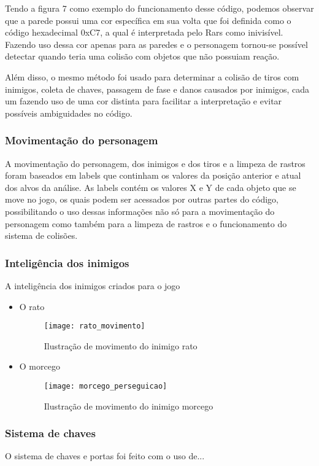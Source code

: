 \documentclass[conference]{IEEEtran}
\begin{document}
Tendo a figura 7 como exemplo do funcionamento desse código, podemos observar que a parede possui uma cor específica em sua volta que foi definida como o código hexadecimal 0xC7, a qual é interpretada pelo Rars como inivisível. Fazendo uso dessa cor apenas para as paredes e o personagem tornou-se possível detectar quando teria uma colisão com objetos que não possuiam reação.

Além disso, o mesmo método foi usado para determinar a colisão de tiros com inimigos, coleta de chaves, passagem de fase e danos causados por inimigos, cada um fazendo uso de uma cor distinta para facilitar a interpretação e evitar possíveis ambiguidades no código.
\subsubsection{Movimentação do personagem} 
  A movimentação do personagem, dos inimigos e dos tiros e a limpeza de rastros foram baseados em labels que continham  os valores da posição anterior e atual dos alvos da análise. As labels contém os valores X e Y de cada objeto que se move no jogo, os quais podem ser acessados por outras partes do código, possibilitando o uso dessas informações não só para a movimentação do personagem como também para a limpeza de rastros e o funcionamento do sistema de colisões.
  
\subsubsection{Inteligência dos inimigos} 
  A inteligência dos inimigos criados para o jogo
\begin{itemize}
  \item O rato
  
\begin{figure}[h]
\centering
\texttt{[image: rato\_movimento]}
\caption{Ilustração de movimento do inimigo rato}
\end{figure}  
  
  \item O morcego
  
\begin{figure}[H]
\centering
\texttt{[image: morcego\_perseguicao]}
\caption{Ilustração de movimento do inimigo morcego}
\end{figure}  

\end{itemize}
 
\subsubsection{Sistema de chaves}  
O sistema de chaves e portas foi feito com o uso de...
\end{document}
